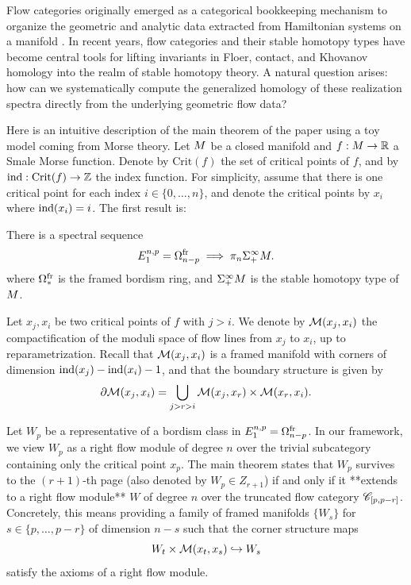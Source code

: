 Flow categories originally emerged as a categorical bookkeeping mechanism to organize the geometric and analytic data extracted from Hamiltonian systems on a manifold \cite{CJS95}. In recent years, flow categories and their stable homotopy types have become central tools for lifting invariants in Floer, contact, and Khovanov homology into the realm of stable homotopy theory. A natural question arises: how can we systematically compute the generalized homology of these realization spectra directly from the underlying geometric flow data?   

Here is an intuitive description of the main theorem of the paper using a toy model coming from Morse theory.
Let $M$ be a closed manifold and $f: M \to \mathbb{R}$ a Smale Morse function. Denote by $\mathrm{Crit}(f)$ the set of critical points of $f$, and by $\operatorname{ind}: \mathrm{Crit}(f) \to \mathbb{Z}$ the index function. For simplicity, assume that there is one critical point for each index $i \in \{0, \dots, n\}$, and denote the critical points by $x_i$ where $\operatorname{ind}(x_i) = i$.
The first result is:

There is a spectral sequence 
\begin{equation*}
    E_{1}^{n,p} = \Omega^{\operatorname{fr}}_{n-p} \implies \pi_n \Sigma^{\infty}_+ M.
\end{equation*}
where $\Omega^{\operatorname{fr}}_*$ is the framed bordism ring, and $\Sigma^{\infty}_+ M$ is the stable homotopy type of  $M$.

Let $x_j,x_i$ be two critical points of $f$ with $j > i$. We denote by $\mathcal{M}(x_j,x_i)$ the compactification of the moduli space of flow lines from $x_j$ to $x_i$, up to reparametrization. Recall that $\mathcal{M}(x_j,x_i)$ is a framed manifold with corners of dimension $\operatorname{ind}(x_j) - \operatorname{ind}(x_i) - 1$, and that the boundary structure is given by
\begin{equation*}
    \partial \mathcal{M}(x_j,x_i) = \bigcup_{j > r > i} \mathcal{M}(x_j,x_r) \times \mathcal{M}(x_r,x_i).
\end{equation*}

Let $W_p$ be a representative of a bordism class in $E_{1}^{n,p} = \Omega^{\operatorname{fr}}_{n-p}$.
In our framework, we view $W_p$ as a right flow module of degree $n$ over the trivial subcategory containing only the critical point $x_p$.
The main theorem states that $W_p$ survives to the $(r+1)$-th page (also denoted by $W_p \in Z_{r+1}$) if and only if it **extends to a right flow module** $W$ of degree $n$ over the truncated flow category $\mathscr{C}_{[p, p-r]}$.
Concretely, this means providing a family of framed manifolds $\{W_s\}$ for $s \in \{p, \dots, p-r\}$ of dimension $n-s$ such that the corner structure maps
\begin{equation*}
    W_t \times \mathcal{M}(x_t,x_s) \hookrightarrow W_s
\end{equation*}
satisfy the axioms of a right flow module.

